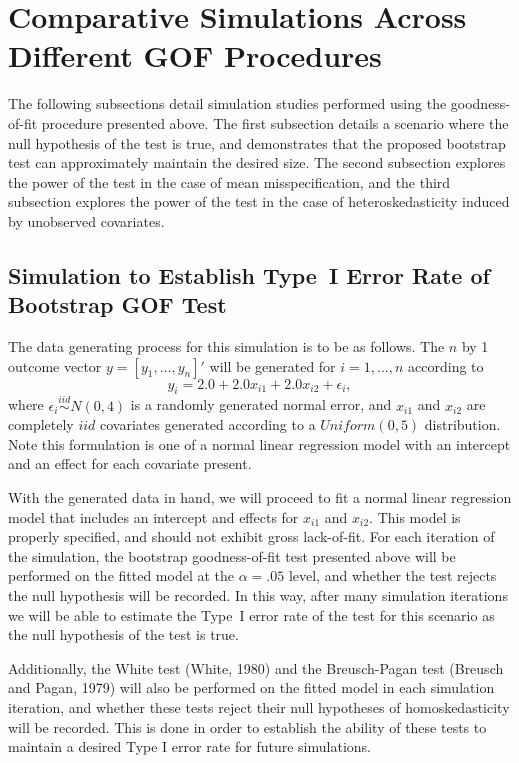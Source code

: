 		\section{Comparative Simulations Across Different GOF Procedures} \label{sec:gof_sim}

		The following subsections detail simulation studies performed using the goodness-of-fit procedure presented above. The first subsection details a scenario where the null
		hypothesis of the test is true, and demonstrates that the proposed bootstrap test can approximately maintain the desired size. The second subsection 
		explores the power of the test in the case of mean misspecification, and the third subsection explores the power of the test in the case of heteroskedasticity induced by
		unobserved covariates.

		\subsection{Simulation to Establish Type~I Error Rate of Bootstrap GOF Test}

		The data generating process for this simulation is to be as follows. The $n$ by 1 outcome vector $y = [y_1,...,y_n]'$ will be generated for $i = 1,...,n$ according
		to
		\begin{equation*}
			y_i = 2.0 + 2.0 x_{i1} + 2.0 x_{i2} + \epsilon_i , 
		\end{equation*}
		where $\epsilon_i \stackrel{iid}{\sim} N(0,4)$ is a randomly generated normal error, and $x_{i1}$ and $x_{i2}$ are completely $iid$ covariates generated according to
		a $Uniform(0,5)$ distribution. Note this formulation is one of a normal linear regression model with an intercept and an effect for each covariate present.

		With the generated data in hand, we will proceed to fit a normal linear regression model that includes an intercept and effects for $x_{i1}$ and $x_{i2}$. This model
		is properly specified, and should not exhibit gross lack-of-fit. For each iteration of the simulation, the bootstrap goodness-of-fit test presented above will be
		performed on the fitted model at the $\alpha = .05$ level, and whether the test rejects the null hypothesis will be recorded. In this way, after many simulation iterations
		we will be able to estimate the Type~I error rate of the test for this scenario as the null hypothesis of the test is true.

		Additionally, the White test (White, 1980) and the Breusch-Pagan test (Breusch and Pagan, 1979) will also be performed on the fitted model in each simulation iteration, and
		whether these tests reject their null hypotheses of homoskedasticity will be recorded. This is done in order to establish the ability of these tests to maintain a desired Type
		I error rate for future simulations.

